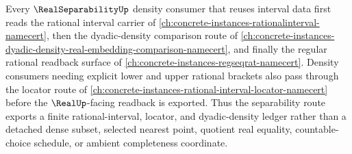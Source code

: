 Every $\RealSeparabilityUp$ density consumer that reuses interval data first reads the rational interval carrier of \autoref{ch:concrete-instances-rationalinterval-namecert}, then the dyadic-density comparison route of \autoref{ch:concrete-instances-dyadic-density-real-embedding-comparison-namecert}, and finally the regular rational readback surface of \autoref{ch:concrete-instances-regseqrat-namecert}. Density consumers needing explicit lower and upper rational brackets also pass through the locator route of \autoref{ch:concrete-instances-rational-interval-locator-namecert} before the $\RealUp$-facing readback is exported. Thus the separability route exports a finite rational-interval, locator, and dyadic-density ledger rather than a detached dense subset, selected nearest point, quotient real equality, countable-choice schedule, or ambient completeness coordinate.

